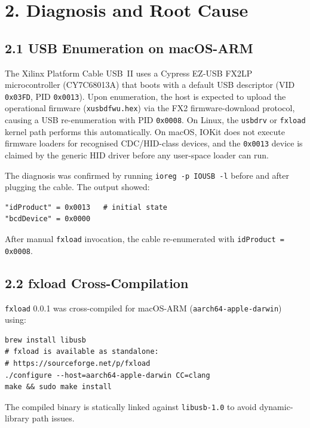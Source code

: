 \section{2. Diagnosis and Root Cause}\label{sec:epilogue-diagnosis}

\subsection{2.1 USB Enumeration on macOS-ARM}%
\label{sec:epilogue-usb}

The Xilinx Platform Cable USB~II uses a Cypress EZ-USB FX2LP
microcontroller (CY7C68013A) that boots with a default USB descriptor
(VID \texttt{0x03FD}, PID \texttt{0x0013}).  Upon enumeration, the host is
expected to upload the operational firmware (\texttt{xusbdfwu.hex}) via the
FX2 firmware-download protocol, causing a USB re-enumeration with PID
\texttt{0x0008}.  On Linux, the \texttt{usbdrv} or \texttt{fxload} kernel
path performs this automatically.  On macOS, IOKit does not execute firmware
loaders for recognised CDC/HID-class devices, and the \texttt{0x0013} device
is claimed by the generic HID driver before any user-space loader can run.

The diagnosis was confirmed by running \verb|ioreg -p IOUSB -l| before and
after plugging the cable.  The output showed:

\begin{verbatim}
"idProduct" = 0x0013   # initial state
"bcdDevice" = 0x0000
\end{verbatim}

After manual \texttt{fxload} invocation, the cable re-enumerated with
\verb|idProduct = 0x0008|.

\subsection{2.2 fxload Cross-Compilation}\label{sec:epilogue-fxload}

\texttt{fxload} 0.0.1 was cross-compiled for macOS-ARM
(\texttt{aarch64-apple-darwin}) using:

\begin{verbatim}
brew install libusb
# fxload is available as standalone:
# https://sourceforge.net/p/fxload
./configure --host=aarch64-apple-darwin CC=clang
make && sudo make install
\end{verbatim}

The compiled binary is statically linked against \texttt{libusb-1.0} to
avoid dynamic-library path issues.

